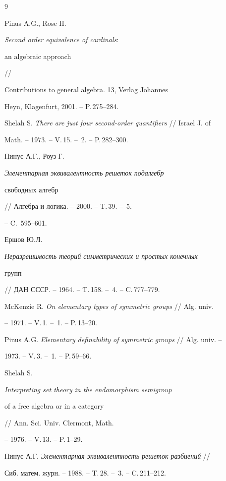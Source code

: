 \begin{thebibliography}{9}







Pinus A.G., Rose H. {\em Second order equivalence of cardinals$:$


an algebraic approach} //


Contributions to general algebra. 13, Verlag Johannes


Heyn, Klagenfurt, 2001. -- P.\,275--284.




Shelah S. {\em There are just four second-order quantifiers} // Israel J. of 


Math. -- 1973. -- V.\,15. -- \No\,2. -- P.\,282--300.




Пинус А.Г., Роуз Г. {\em Элементарная эквивалентность решеток подалгебр


свободных алгебр} // Алгебра и логика. -- 2000. -- T.\,39. -- \No\,5.


-- C.\, 595--601.




Ершов Ю.Л. {\em Неразрешимость теорий симметрических и простых конечных


групп} // ДАН СССР. -- 1964. -- T.\,158. -- \No\,4. -- C.\,777--779.




McKenzie R. {\em On elementary types of symmetric groups} // Alg. univ.


-- 1971. -- V.\,1. -- \No\,1. -- P.\,13--20.




Pinus A.G. {\em Elementary definability of symmetric groups} // Alg. univ. --


1973. -- V.\,3. -- \No\,1. -- P.\,59--66.




Shelah S. {\em Interpreting set theory in the endomorphism semigroup


of a free algebra or in a category} // Ann. Sci. Univ. Clermont, Math.


-- 1976. -- V.\,13. -- P.\,1--29.




Пинус А.Г. {\em Элементарная эквивалентность решеток разбиений} //


Сиб. матем. журн. -- 1988. -- T.\,28. -- \No\,3. -- C.\,211--212.








\end{thebibliography}





\vskip 2cm












\label{end}






